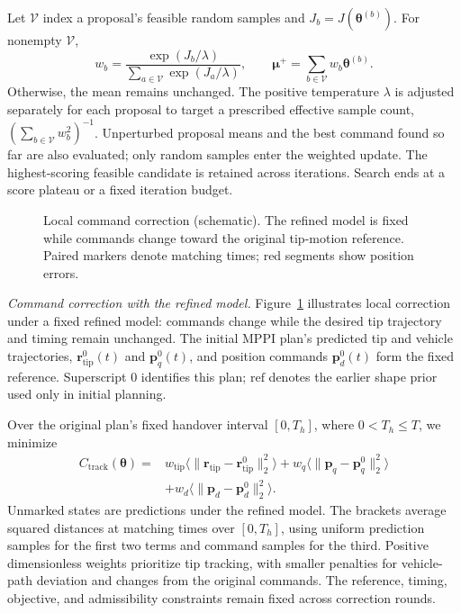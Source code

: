 \documentclass[letterpaper, 10 pt, conference]{ieeeconf}
\begin{document}
Let $\mathcal V$ index a proposal's feasible random samples and
$J_b=J(\boldsymbol\theta^{(b)})$. For nonempty $\mathcal V$,
\begin{equation}
w_b=\frac{\exp(J_b/\lambda)}{\sum_{a\in\mathcal V}\exp(J_a/\lambda)},
\qquad
\boldsymbol\mu^+=\sum_{b\in\mathcal V}w_b\boldsymbol\theta^{(b)}.
\label{eq:offline_sampling_update}
\end{equation}
Otherwise, the mean remains unchanged. The positive temperature
$\lambda$ is adjusted separately for each proposal to target a
prescribed effective sample count,
$(\sum_{b\in\mathcal V}w_b^2)^{-1}$.
Unperturbed proposal means and the best command found so far
are also evaluated; only random samples enter the weighted update.
The highest-scoring feasible candidate is retained across iterations.
Search ends at a score plateau or a fixed iteration budget.

\begin{figure}[t]
    \centering
    \resizebox{\columnwidth}{!}{}
    \caption{Local command correction (schematic).
    The refined model is fixed while commands change toward the
    original tip-motion reference. Paired markers denote matching
    times; red segments show position errors.}
    \label{fig:command_correction}
\end{figure}

\noindent\emph{Command correction with the refined model.}
Figure~\ref{fig:command_correction} illustrates local correction
under a fixed refined model: commands change while the desired
tip trajectory and timing remain unchanged. The initial MPPI
plan's predicted tip and vehicle trajectories,
$\mathbf r_{\mathrm{tip}}^0(t)$ and $\mathbf p_q^0(t)$,
and position commands $\mathbf p_d^0(t)$ form the fixed reference.
Superscript $0$ identifies this plan; $\mathrm{ref}$ denotes
the earlier shape prior used only in initial planning.

Over the original plan's fixed handover interval $[0,T_h]$,
where $0<T_h\leq T$, we minimize
\begin{equation}
\begin{aligned}
C_{\mathrm{track}}(\boldsymbol\theta)
={}&w_{\mathrm{tip}}\bigl\langle\|\mathbf r_{\mathrm{tip}}-\mathbf r_{\mathrm{tip}}^0\|_2^2\bigr\rangle
+w_q\bigl\langle\|\mathbf p_q-\mathbf p_q^0\|_2^2\bigr\rangle\\
&+w_d\bigl\langle\|\mathbf p_d-\mathbf p_d^0\|_2^2\bigr\rangle.
\end{aligned}
\label{eq:reference_tracking_cost}
\end{equation}
Unmarked states are predictions under the refined model.
The brackets average squared distances at matching times over
$[0,T_h]$, using uniform prediction samples for the first two
terms and command samples for the third. Positive dimensionless
weights prioritize tip tracking, with smaller penalties for
vehicle-path deviation and changes from the original commands.
The reference, timing, objective, and admissibility constraints
remain fixed across correction rounds.
\end{document}
